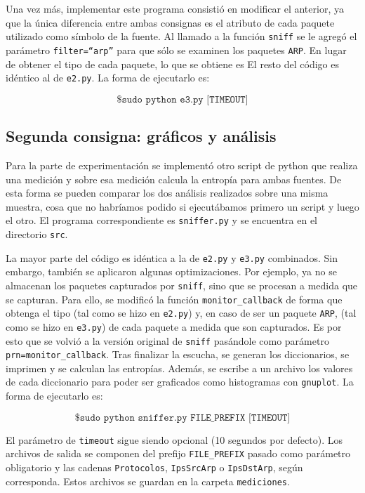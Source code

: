 Una vez más, implementar este programa consistió en modificar el anterior, ya que la única diferencia entre ambas
consignas es el atributo de cada paquete utilizado como símbolo de la fuente. Al llamado a la función \texttt{sniff}
se le agregó el parámetro \texttt{filter=``arp''} para que sólo se examinen los paquetes \texttt{ARP}. En lugar de
obtener el tipo de cada paquete, lo que se obtiene es %
El resto del código es idéntico al de \texttt{e2.py}. La forma de ejecutarlo es:

\[
\texttt{\$ sudo python e3.py [TIMEOUT]}
\]

\subsection{Segunda consigna: gráficos y análisis}

Para la parte de experimentación se implementó otro script de python que realiza una medición y sobre
esa medición calcula la entropía para ambas fuentes. De esta forma se pueden comparar los dos análisis
realizados sobre una misma muestra, cosa que no habríamos podido si ejecutábamos primero un script y luego
el otro. El programa correspondiente es \texttt{sniffer.py} y se encuentra en el directorio \texttt{src}.

La mayor parte del código es idéntica a la de \texttt{e2.py} y \texttt{e3.py} combinados. Sin embargo,
también se aplicaron algunas optimizaciones. Por ejemplo, ya no se almacenan los paquetes capturados por
\texttt{sniff}, sino que se procesan a medida que se capturan. Para ello, se modificó la función
\texttt{monitor\_callback} de forma que obtenga el tipo (tal como se hizo en \texttt{e2.py}) y, en caso
de ser un paquete \texttt{ARP}, %
(tal como se hizo en \texttt{e3.py}) de cada paquete a medida que son capturados. Es por esto que se volvió
a la versión original de \texttt{sniff} pasándole como parámetro \texttt{prn=monitor\_callback}. Tras finalizar
la escucha, se generan los diccionarios, se imprimen y se calculan las entropías. Además, se escribe a un archivo
los valores de cada diccionario para poder ser graficados como histogramas con \texttt{gnuplot}. La forma de
ejecutarlo es:

\[
\texttt{\$ sudo python sniffer.py FILE\_PREFIX [TIMEOUT]}
\]

El parámetro de \texttt{timeout} sigue siendo opcional (10 segundos por defecto). Los archivos de salida
se componen del prefijo \texttt{FILE\_PREFIX} pasado como parámetro obligatorio y las cadenas \texttt{Protocolos},
\texttt{IpsSrcArp} o \texttt{IpsDstArp}, según corresponda. Estos archivos se guardan en la carpeta \texttt{mediciones}.

